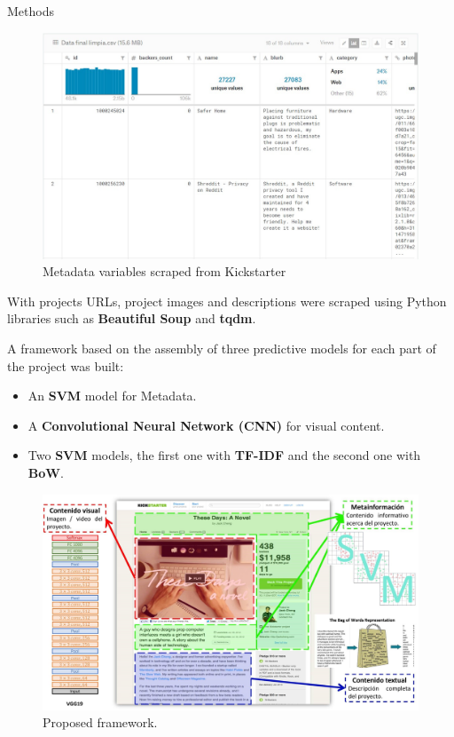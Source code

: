 \documentclass[final]{beamer}
\newlength{\onecolwid}
\begin{document}
\begin{frame}[t]
\begin{columns}[t]
\begin{column}{\onecolwid}
\begin{block}{Methods}
		\begin{figure}
			\includegraphics[width=0.8\linewidth]{metadata.jpg}
			\caption{Metadata variables scraped from Kickstarter}
		\end{figure}
	With projects URLs, project images and descriptions were scraped using Python libraries such as \textbf{Beautiful Soup} and \textbf{tqdm}.
	
	A framework based on the assembly of three predictive models for each part of the project was built:
		
		\begin{itemize}
			\item An \textbf{SVM} model for Metadata.
			\item A \textbf{Convolutional Neural Network (CNN)} for visual content.
			\item Two \textbf{SVM} models, the first one with \textbf{TF-IDF} and the second one with \textbf{BoW}.
		\end{itemize}
		
		\begin{figure}
			\includegraphics[width=0.95\linewidth]{prototipo.jpg}
			\caption{Proposed framework.}
		\end{figure}
		

\end{block}
\end{column}
\end{columns}
\end{frame}
\end{document}
